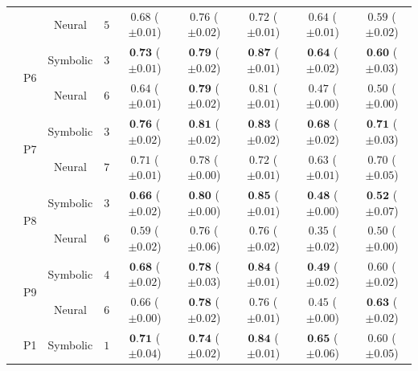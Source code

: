 \begin{table}[!t]
\begin{tabular}{ccccccccc}
		&  & Neural & $5$ & $0.68 $ {\tiny ($\pm 0.01$)} & $0.76 $ {\tiny ($\pm 0.02$)} & $0.72 $ {\tiny ($\pm 0.01$)} & $0.64 $ {\tiny ($\pm 0.01$)} & $0.59 $ {\tiny ($\pm 0.02$)}\\
		\cmidrule{2-9}
		& \multirow{2}{*}{P6} & Symbolic & $3$ & $\textbf{0.73} $ {\tiny ($\pm 0.01$)} & $\textbf{0.79} $ {\tiny ($\pm 0.02$)} & $\textbf{0.87} $ {\tiny ($\pm 0.01$)} & $\textbf{0.64} $ {\tiny ($\pm 0.02$)} & $\textbf{0.60} $ {\tiny ($\pm 0.03$)}\\
		&  & Neural & $6$ & $0.64 $ {\tiny ($\pm 0.01$)} & $\textbf{0.79} $ {\tiny ($\pm 0.02$)} & $0.81 $ {\tiny ($\pm 0.01$)} & $0.47 $ {\tiny ($\pm 0.00$)} & $0.50 $ {\tiny ($\pm 0.00$)}\\
		\cmidrule{2-9}
		& \multirow{2}{*}{P7} & Symbolic & $3$ & $\textbf{0.76} $ {\tiny ($\pm 0.02$)} & $\textbf{0.81} $ {\tiny ($\pm 0.02$)} & $\textbf{0.83} $ {\tiny ($\pm 0.02$)} & $\textbf{0.68} $ {\tiny ($\pm 0.02$)} & $\textbf{0.71} $ {\tiny ($\pm 0.03$)}\\
		&  & Neural & $7$ & $0.71 $ {\tiny ($\pm 0.01$)} & $0.78 $ {\tiny ($\pm 0.00$)} & $0.72 $ {\tiny ($\pm 0.01$)} & $0.63 $ {\tiny ($\pm 0.01$)} & $0.70 $ {\tiny ($\pm 0.05$)}\\
		\cmidrule{2-9}
		& \multirow{2}{*}{P8} & Symbolic & $3$ & $\textbf{0.66} $ {\tiny ($\pm 0.02$)} & $\textbf{0.80} $ {\tiny ($\pm 0.00$)} & $\textbf{0.85} $ {\tiny ($\pm 0.01$)} & $\textbf{0.48} $ {\tiny ($\pm 0.00$)} & $\textbf{0.52} $ {\tiny ($\pm 0.07$)}\\
		&  & Neural & $6$ & $0.59 $ {\tiny ($\pm 0.02$)} & $0.76 $ {\tiny ($\pm 0.06$)} & $0.76 $ {\tiny ($\pm 0.02$)} & $0.35 $ {\tiny ($\pm 0.02$)} & $0.50 $ {\tiny ($\pm 0.00$)}\\
		\cmidrule{2-9}
		& \multirow{2}{*}{P9} & Symbolic & $4$ & $\textbf{0.68} $ {\tiny ($\pm 0.02$)} & $\textbf{0.78} $ {\tiny ($\pm 0.03$)} & $\textbf{0.84} $ {\tiny ($\pm 0.01$)} & $\textbf{0.49} $ {\tiny ($\pm 0.02$)} & $0.60 $ {\tiny ($\pm 0.02$)}\\
		&  & Neural & $6$ & $0.66 $ {\tiny ($\pm 0.00$)} & $\textbf{0.78} $ {\tiny ($\pm 0.02$)} & $0.76 $ {\tiny ($\pm 0.01$)} & $0.45 $ {\tiny ($\pm 0.00$)} & $\textbf{0.63} $ {\tiny ($\pm 0.02$)}\\
		\bottomrule\toprule
		\multirow{19}{*}{\rotatebox[origin=c]{90}{Propositional}} & \multirow{2}{*}{P1} & Symbolic & $1$ & $\textbf{0.71} $ {\tiny ($\pm 0.04$)} & $\textbf{0.74} $ {\tiny ($\pm 0.02$)} & $\textbf{0.84} $ {\tiny ($\pm 0.01$)} & $\textbf{0.65} $ {\tiny ($\pm 0.06$)} & $0.60 $ {\tiny ($\pm 0.05$)}\\

\end{tabular}
\end{table}
